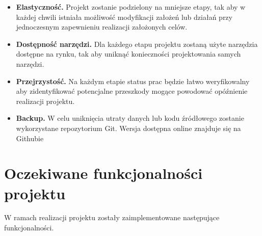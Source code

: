 \documentclass[a4paper,12pt,reqno]{article}
\begin{document}
\begin{itemize}
	\item \textbf{Elastyczność.} Projekt zostanie podzielony na mniejsze etapy, tak aby w każdej chwili istniała możliwość modyfikacji założeń lub działań przy jednoczesnym zapewnieniu realizacji założonych celów.
	\item \textbf{Dostępność narzędzi.} Dla każdego etapu projektu zostaną użyte narzędzia dostępne na rynku, tak aby uniknąć konieczności projektowania samych narzędzi.
	\item \textbf{Przejrzystość.} Na każdym etapie status prac będzie łatwo weryfikowalny aby zidentyfikować potencjalne przeszkody mogące powodować opóźnienie realizacji projektu.
	\item \textbf{Backup.} W celu uniknięcia utraty danych lub kodu źródłowego zostanie wykorzystane repozytorium Git. Wersja dostępna online znajduje się na Githubie \cite{moj_github}
\end{itemize}

\newpage
\section{Oczekiwane funkcjonalności projektu} \label{section:oczekiwania}

W ramach realizacji projektu zostały zaimplementowane następujące funkcjonalności.
\end{document}
